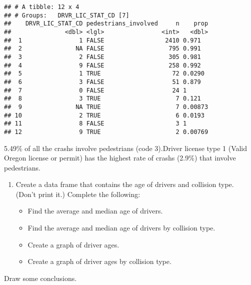 \documentclass[]{article}
\newenvironment{Shaded}{\begin{snugshade}}{\end{snugshade}}
\newcommand{\KeywordTok}[1]{\textcolor[rgb]{0.13,0.29,0.53}{\textbf{#1}}}
\newcommand{\DataTypeTok}[1]{\textcolor[rgb]{0.13,0.29,0.53}{#1}}
\newcommand{\StringTok}[1]{\textcolor[rgb]{0.31,0.60,0.02}{#1}}
\newcommand{\CommentTok}[1]{\textcolor[rgb]{0.56,0.35,0.01}{\textit{#1}}}
\newcommand{\OperatorTok}[1]{\textcolor[rgb]{0.81,0.36,0.00}{\textbf{#1}}}
\newcommand{\NormalTok}[1]{#1}
\providecommand{\tightlist}{%
  \setlength{\itemsep}{0pt}\setlength{\parskip}{0pt}}
\begin{document}
\begin{verbatim}
## # A tibble: 12 x 4
## # Groups:   DRVR_LIC_STAT_CD [7]
##    DRVR_LIC_STAT_CD pedestrians_involved     n    prop
##               <dbl> <lgl>                <int>   <dbl>
##  1                1 FALSE                 2410 0.971  
##  2               NA FALSE                  795 0.991  
##  3                2 FALSE                  305 0.981  
##  4                9 FALSE                  258 0.992  
##  5                1 TRUE                    72 0.0290 
##  6                3 FALSE                   51 0.879  
##  7                0 FALSE                   24 1      
##  8                3 TRUE                     7 0.121  
##  9               NA TRUE                     7 0.00873
## 10                2 TRUE                     6 0.0193 
## 11                8 FALSE                    3 1      
## 12                9 TRUE                     2 0.00769
\end{verbatim}

5.49\% of all the crashs involve pedestrians (code 3).\n Driver license
type 1 (Valid Oregon license or permit) has the highest rate of crashs
(2.9\%) that involve pedestrians.

\begin{enumerate}
\def\labelenumi{\alph{enumi}.}
\setcounter{enumi}{4}
\tightlist
\item
  Create a data frame that contains the age of drivers and collision
  type. (Don't print it.) Complete the following:

  \begin{itemize}
  \tightlist
  \item
    Find the average and median age of drivers.
  \item
    Find the average and median age of drivers by collision type.
  \item
    Create a graph of driver ages.
  \item
    Create a graph of driver ages by collision type.
  \end{itemize}
\end{enumerate}

Draw some conclusions.

\begin{Shaded}
\end{Shaded}
\end{document}
